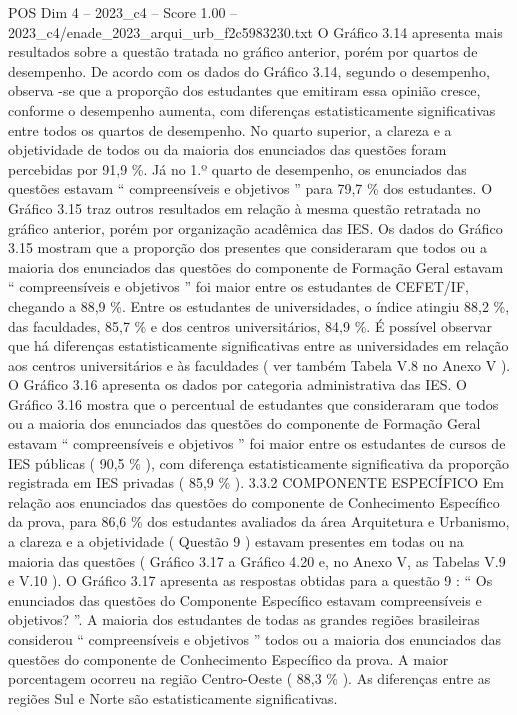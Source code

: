 \begin{textsample}{POS Dim 4 – 2023\_c4 – Score 1.00 – 2023\_c4/enade\_2023\_arqui\_urb\_f2c5983230.txt}
O Gráfico 3.14 apresenta mais resultados sobre a questão tratada no gráfico anterior, porém por quartos de desempenho.
De acordo com os dados do Gráfico 3.14, segundo o desempenho, observa -se que a proporção dos estudantes que emitiram essa opinião cresce, conforme o desempenho aumenta, com diferenças estatisticamente significativas entre todos os quartos de desempenho.
No quarto superior, a clareza e a objetividade de todos ou da maioria dos enunciados das questões foram percebidas por 91,9 \%.
Já no 1.º quarto de desempenho, os enunciados das questões estavam “ compreensíveis e objetivos ” para 79,7 \% dos estudantes.
O Gráfico 3.15 traz outros resultados em relação à mesma questão retratada no gráfico anterior, porém por organização acadêmica das IES.
Os dados do Gráfico 3.15 mostram que a proporção dos presentes que consideraram que todos ou a maioria dos enunciados das questões do componente de Formação Geral estavam “ compreensíveis e objetivos ” foi maior entre os estudantes de CEFET/IF, chegando a 88,9 \%.
Entre os estudantes de universidades, o índice atingiu 88,2 \%, das faculdades, 85,7 \% e dos centros universitários, 84,9 \%.
É possível observar que há diferenças estatisticamente significativas entre as universidades em relação aos centros universitários e às faculdades ( ver também Tabela V.8 no Anexo V ).
O Gráfico 3.16 apresenta os dados por categoria administrativa das IES.
O Gráfico 3.16 mostra que o percentual de estudantes que consideraram que todos ou a maioria dos enunciados das questões do componente de Formação Geral estavam “ compreensíveis e objetivos ” foi maior entre os estudantes de cursos de IES públicas ( 90,5 \% ), com diferença estatisticamente significativa da proporção registrada em IES privadas ( 85,9 \% ). 3.3.2 COMPONENTE ESPECÍFICO Em relação aos enunciados das questões do componente de Conhecimento Específico da prova, para 86,6 \% dos estudantes avaliados da área Arquitetura e Urbanismo, a clareza e a objetividade ( Questão 9 ) estavam presentes em todas ou na maioria das questões ( Gráfico 3.17 a Gráfico 4.20 e, no Anexo V, as Tabelas V.9 e V.10 ).
O Gráfico 3.17 apresenta as respostas obtidas para a questão 9 : “ Os enunciados das questões do Componente Específico estavam compreensíveis e objetivos? ”.
A maioria dos estudantes de todas as grandes regiões brasileiras considerou “ compreensíveis e objetivos ” todos ou a maioria dos enunciados das questões do componente de Conhecimento Específico da prova.
A maior porcentagem ocorreu na região Centro-Oeste ( 88,3 \% ).
As diferenças entre as regiões Sul e Norte são estatisticamente significativas.

\end{textsample}
